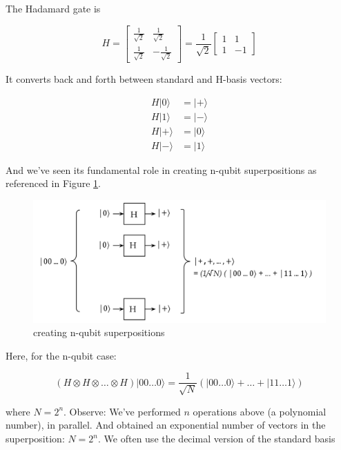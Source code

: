 \documentclass[main.tex]{subfiles}
\begin{document}
    The Hadamard gate is
    
    $$
    H=\left[\begin{array}{cc}
    \frac{1}{\sqrt{2}} & \frac{1}{\sqrt{2}} \\
    \frac{1}{\sqrt{2}} & -\frac{1}{\sqrt{2}}
    \end{array}\right]=\frac{1}{\sqrt{2}}\left[\begin{array}{cc}
    1 & 1 \\
    1 & -1
    \end{array}\right]
    $$
    
    It converts back and forth between standard and H-basis vectors:
    
    $$
    \begin{aligned}
    H|0\rangle &=|+\rangle \\
    H|1\rangle &=|-\rangle \\
    H|+\rangle &=|0\rangle \\
    H|-\rangle &=|1\rangle
    \end{aligned}
    $$
    
    And we've seen its fundamental role in creating n-qubit superpositions as referenced in Figure \ref{fig:07gate6}.
    
    \begin{figure}
        \centering
        \includegraphics[width=5in]{notes/figs/n08/07gate6.png}
        \caption{creating n-qubit superpositions}
        \label{fig:07gate6}
    \end{figure}
    
    Here, for the n-qubit case:
    
    $$
    (H \otimes H \otimes \ldots \otimes H)|00 \ldots 0\rangle=\frac{1}{\sqrt{N}}(|00 \ldots 0\rangle+\ldots+|11 \ldots 1\rangle)
    $$
    
    where $N=2^{n}$. Observe: We've performed $n$ operations above (a polynomial number), in parallel. And obtained an exponential number of vectors in the superposition: $N=2^{n}$. We often use the decimal version of the standard basis
    
\end{document}
